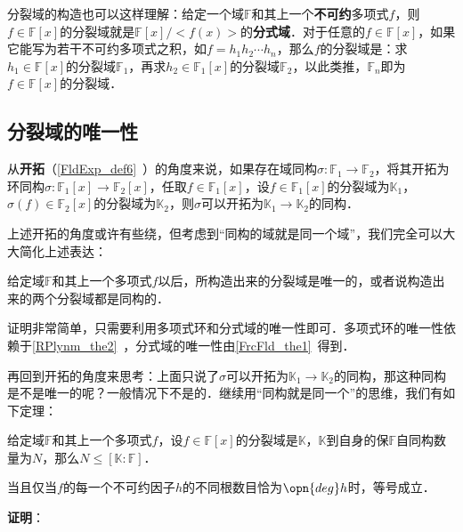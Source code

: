 分裂域的构造也可以这样理解：给定一个域$\mathbb{F}$和其上一个\textbf{不可约}多项式$f$，则$f\in\mathbb{F}[x]$的分裂域就是$\mathbb{F}[x]/<f(x)>$的\textbf{分式域}．对于任意的$f\in\mathbb{F}[x]$，如果它能写为若干不可约多项式之积，如$f=h_1h_2\cdots h_n$，那么$f$的分裂域是：求$h_1\in\mathbb{F}[x]$的分裂域$\mathbb{F}_1$，再求$h_2\in\mathbb{F}_1[x]$的分裂域$\mathbb{F}_2$，以此类推，$\mathbb{F}_n$即为$f\in\mathbb{F}[x]$的分裂域．










\subsection{分裂域的唯一性}

从\textbf{开拓}（\autoref{FldExp_def6}~）的角度来说，如果存在域同构$\sigma:\mathbb{F}_1\to\mathbb{F}_2$，将其开拓为环同构$\sigma:\mathbb{F}_1[x]\to\mathbb{F}_2[x]$，任取$f\in\mathbb{F}_1[x]$，设$f\in\mathbb{F}_1[x]$的分裂域为$\mathbb{K}_1$，$\sigma(f)\in\mathbb{F}_2[x]$的分裂域为$\mathbb{K}_2$，则$\sigma$可以开拓为$\mathbb{K}_1\to\mathbb{K}_2$的同构．

上述开拓的角度或许有些绕，但考虑到“同构的域就是同一个域”，我们完全可以大大简化上述表达：

\begin{theorem}{}
给定域$\mathbb{F}$和其上一个多项式$f$以后，所构造出来的分裂域是唯一的，或者说构造出来的两个分裂域都是同构的．
\end{theorem}

证明非常简单，只需要利用多项式环和分式域的唯一性即可．多项式环的唯一性依赖于\autoref{RPlynm_the2}~，分式域的唯一性由\autoref{FrcFld_the1}~得到．

再回到开拓的角度来思考：上面只说了$\sigma$可以开拓为$\mathbb{K}_1\to\mathbb{K}_2$的同构，那这种同构是不是唯一的呢？一般情况下不是的．继续用“同构就是同一个”的思维，我们有如下定理：

\begin{theorem}{}\label{SpltFd_the1}
给定域$\mathbb{F}$和其上一个多项式$f$，设$f\in\mathbb{F}[x]$的分裂域是$\mathbb{K}$，$\mathbb{K}$到自身的保$\mathbb{F}$自同构数量为$N$，那么$N\leq[\mathbb{K}:\mathbb{F}]$．

当且仅当$f$的每一个不可约因子$h$的不同根数目恰为$\opn{deg}h$时，等号成立．
\end{theorem}

\textbf{证明}：

